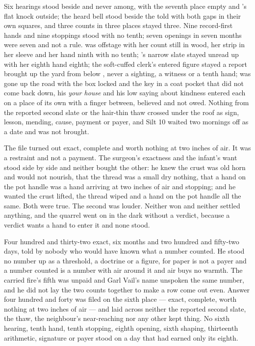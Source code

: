 Six hearings stood beside and never among, with the seventh place empty and 's flat knock outside; the heard bell stood beside the told with both gaps in their own squares, and three counts in three places stayed three. Nine record-first hands and nine stoppings stood with no tenth; seven openings in seven months were seven and not a rule.  was offstage with her count still in wood, her strip in her sleeve and her hand ninth with no tenth; 's narrow slate stayed unread up  with her eighth hand eighth; the soft-cuffed clerk's entered figure stayed a report brought up the yard from  below , never a sighting, a witness or a tenth hand;  was gone up the road with the box locked and the key in a coat pocket that did not come back down, his \emph{your house} and his low saying about kindness entered each on a place of its own with a finger between, believed and not owed. Nothing from the reported second slate or the hair-thin thaw crossed under the roof as sign, lesson, mending, cause, payment or payer, and Silt 10 waited two mornings off as a date and was not brought.

The file turned out exact, complete and worth nothing at two inches of air. It was a restraint and not a payment. The surgeon's exactness and the infant's want stood side by side and neither bought the other: he knew the crust was old horn and would not nourish, that the thread was a small dry nothing, that a hand on the pot handle was a hand arriving at two inches of air and stopping; and he wanted the crust lifted, the thread wiped and a hand on the pot handle all the same. Both were true. The second was louder. Neither won and neither settled anything, and the quarrel went on in the dark without a verdict, because a verdict wants a hand to enter it and none stood.

Four hundred and thirty-two exact, six months and two hundred and fifty-two days, told by nobody who would have known what a number counted. He stood no number up as a threshold, a doctrine or a figure, for paper is not a payer and a number counted is a number with air around it and air buys no warmth. The carried fire's fifth was unpaid and Garl Vail's name unspoken the same number, and he did not lay the two counts together to make a row come out even. Answer four hundred and forty was filed on the sixth place --- exact, complete, worth nothing at two inches of air --- and laid across neither the reported second slate, the thaw, the neighbour's near-reaching nor any other kept thing. No sixth hearing, tenth hand, tenth stopping, eighth opening, sixth shaping, thirteenth arithmetic, signature or payer stood on a day that had earned only its eighth.

